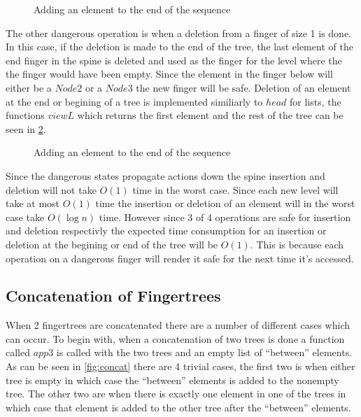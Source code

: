 \begin{figure}[h!]

\caption{Adding an element to the end of the sequence \label{fig:AddLast}}
\end{figure}

The other dangerous operation is when a deletion from a finger of size 1 is
done. In this case, if the deletion is made to the end of the tree, the last
element of the end finger in the spine is deleted and used as the finger for the
level where the the finger would have been empty. Since the element in the
finger below will either be a $Node2$ or a $Node3$ the new finger will be safe.
Deletion of an element at the end or begining of a tree is implemented
similiarly to $head$ for lists, the functions $viewL$ which returns the first
element and the rest of the tree can be seen in \cref{fig:Viewl}.

\begin{figure}[h!]

\caption{Adding an element to the end of the sequence \label{fig:Viewl}}
\end{figure}

Since the dangerous states propagate actions down the spine insertion and
deletion will not take $O(1)$ time in the worst case. Since
each new level will take at most $O(1)$ time the insertion or deletion of an
element will in the worst case take $O(\log n)$ time. However since 3 of 4
operations are safe for insertion and deletion respectivly the expected time
consumption for an insertion or deletion at the begining or end of the tree will
be $O(1)$. This is because each operation on a dangerous finger will render it
safe for the next time it's accessed.

\subsection{Concatenation of Fingertrees}
When 2 fingertrees are concatenated there are a number of different cases which
can occur. To begin with, when a concatenation of two trees is done a function
called $app3$ is called with the two trees and an empty list of ``between''
elements. As can be seen in \cref{fig:concat} there are 4 trivial cases, the first
two is when either tree is empty in which case the ``between'' elements is
added to the nonempty tree. The other two are when there is exactly one element
in one of the trees in which case that element is added to the other tree after
the ``between'' elements.

